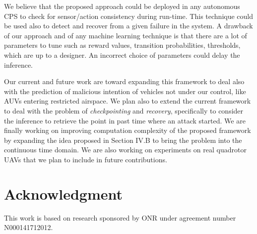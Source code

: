 \documentclass[letterpaper, 10 pt, conference]{ieeeconf}  %
\newcommand\NB[1]{$\spadesuit$\footnote{NB: #1}}
\begin{document}
We believe that the proposed approach could be deployed in any autonomous CPS to check for sensor/action consistency during run-time. This technique could be used also to detect and recover from a given failure in the system. A drawback of our approach and of any machine learning technique is that there are a lot of parameters to tune such as reward values, transition probabilities, thresholds, which are up to a designer. An incorrect choice of parameters could delay the inference. 

Our current and future work are toward expanding this framework to deal also with the prediction of malicious intention of vehicles not under our control, like AUVs entering restricted airspace. We plan also to extend the current framework to deal with the problem of {\em checkpointing} and {\em recovery}, specifically to consider the inference to retrieve the point in past time where an attack started.
We are finally working on improving computation complexity of the proposed framework by expanding the idea proposed in Section IV.B to bring the problem into the continuous time domain.
We are also working on experiments on real quadrotor UAVs that we plan to include in future contributions.


%
%
\section*{Acknowledgment}
This work is based on research sponsored by ONR under agreement number N000141712012.
\end{document}
